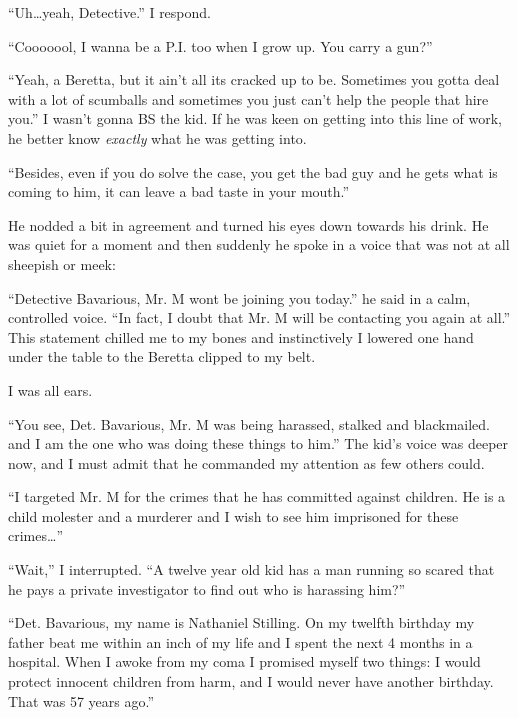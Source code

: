 ``Uh{\ldots}yeah, Detective.'' I respond.



``Cooooool, I wanna be a P.I. too when I grow up. You carry a
gun?''



``Yeah, a Beretta, but it ain't all its cracked up to be. Sometimes
you gotta deal with a lot of scumballs and sometimes you just can't
help the people that hire you.'' I wasn't gonna BS the kid. If he
was keen on getting into this line of work, he better know
{\em exactly} what he was getting into.



``Besides, even if you do solve the case, you get the bad guy and he
gets what is coming to him, it can leave a bad taste in your
mouth.''



He nodded a bit in agreement and turned his eyes down towards his
drink. He was quiet for a moment and then suddenly he spoke in a
voice that was not at all sheepish or meek:



``Detective Bavarious, Mr. M wont be joining you today.'' he said in
a calm, controlled voice. ``In fact, I doubt that Mr. M will be
contacting you again at all.'' This statement chilled me to my bones
and instinctively I lowered one hand under the table to the Beretta
clipped to my belt.



I was all ears.



``You see, Det. Bavarious, Mr. M was being harassed, stalked and
blackmailed. and I am the one who was doing these things to him.''
The kid's voice was deeper now, and I must admit that he commanded
my attention as few others could.



``I targeted Mr. M for the crimes that he has committed against
children. He is a child molester and a murderer and I wish to see
him imprisoned for these crimes{\ldots}''



``Wait,'' I interrupted. ``A twelve year old kid has a man running so
scared that he pays a private investigator to find out who is
harassing him?''



``Det. Bavarious, my name is Nathaniel Stilling. On my twelfth
birthday my father beat me within an inch of my life and I spent
the next 4 months in a hospital. When I awoke from my coma I
promised myself two things: I would protect innocent children from
harm, and I would never have another birthday. That was 57 years
ago.''



